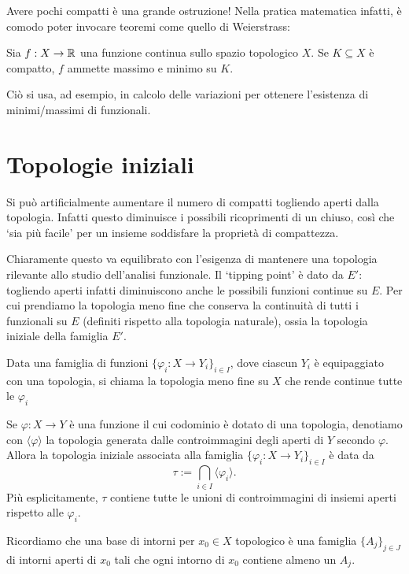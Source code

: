 Avere pochi compatti è una grande ostruzione! Nella pratica matematica infatti, è comodo poter invocare teoremi come quello di Weierstrass:

\begin{theorem}[Weierstrass]
	Sia $f:X \to \mathbb{R}$ una funzione continua sullo spazio topologico $X$.
	Se $K \subseteq X$ è compatto, $f$ ammette massimo e minimo su $K$.
\end{theorem}

Ciò si usa, ad esempio, in calcolo delle variazioni per ottenere l'esistenza di minimi/massimi di funzionali.

\section{Topologie iniziali}
Si può artificialmente aumentare il numero di compatti togliendo aperti dalla topologia. Infatti questo diminuisce i possibili ricoprimenti di un chiuso, così che `sia più facile' per un insieme soddisfare la proprietà di compattezza.

Chiaramente questo va equilibrato con l'esigenza di mantenere una topologia rilevante allo studio dell'analisi funzionale. Il `tipping point' è dato da $E'$: togliendo aperti infatti diminuiscono anche le possibili funzioni continue su $E$. Per cui prendiamo la topologia meno fine che conserva la continuità di tutti i funzionali su $E$ (definiti rispetto alla topologia naturale), ossia la topologia iniziale della famiglia $E'$.

\begin{definition}
	Data una famiglia di funzioni $\{\varphi_i : X \to Y_i\}_{i \in I}$, dove ciascun $Y_i$ è equipaggiato con una topologia, si chiama  la topologia meno fine su $X$ che rende continue tutte le $\varphi_i$
\end{definition}

Se $\varphi : X \to Y$ è una funzione il cui codominio è dotato di una topologia, denotiamo con $\langle \varphi \rangle$ la topologia generata dalle controimmagini degli aperti di $Y$ secondo $\varphi$. Allora la topologia iniziale associata alla famiglia $\{\varphi_i : X \to Y_i\}_{i \in I}$ è data da
\begin{equation*}
	\tau := \bigcap_{i \in I} \langle \varphi_i \rangle.
\end{equation*}
Più esplicitamente, $\tau$ contiene tutte le unioni di controimmagini di insiemi aperti rispetto alle $\varphi_i$.

Ricordiamo che una base di intorni per $x_0 \in X$ topologico è una famiglia $\{A_j\}_{j \in J}$ di intorni aperti di $x_0$ tali che ogni intorno di $x_0$ contiene almeno un $A_j$.

